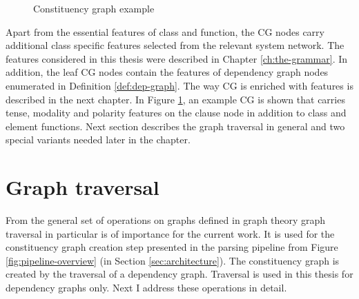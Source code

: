     \begin{figure}[!ht]
    \centering
    \caption{Constituency graph example}
    \label{fig:cg-graph}
    \end{figure}

    Apart from the essential features of class and function, the CG nodes carry additional class specific features selected from the relevant system network. The features considered in this thesis were described in Chapter \ref{ch:the-grammar}. In addition, the leaf CG nodes contain the features of dependency graph nodes enumerated in Definition \ref{def:dep-graph}. The way CG is enriched with features is described in the next chapter. In Figure \ref{fig:cg-graph}, an example CG is shown that carries tense, modality and polarity features on the clause node in addition to class and element functions. Next section describes the graph traversal in general and two special variants needed later in the chapter. 

\section{Graph traversal}
    From the general set of operations on graphs defined in graph theory \citep{bondy1976graph, west2001graph} graph traversal in particular is of importance for the current work. It is used for the constituency graph creation step presented in the parsing pipeline from Figure \ref{fig:pipeline-overview} (in Section \ref{sec:architecture}). The constituency graph is created by the traversal of a dependency graph. Traversal is used in this thesis for dependency graphs only.  Next I address these operations in detail.


